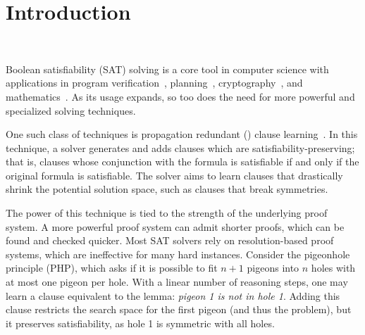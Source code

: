 \section{Introduction}~\label{sec:intro}


Boolean satisfiability (SAT) solving is a core tool in computer science with
applications in program
verification~\cite{BillionQueries,sat-hardwareverification,ic3,bmc},
planning~\cite{planning,planningassat}, cryptography~\cite{cryptominisat}, and
mathematics~\cite{chromaticnumber,pythagoreantriples,kellersconjecture,emptyhexagon}.
As its usage expands, so too does the need for more powerful and specialized
solving techniques.



One such class of techniques is propagation redundant (\pr) clause
learning~\cite{prclauses}. In this technique, a solver generates and adds
clauses which are satisfiability-preserving; that is, clauses whose conjunction
with the formula is satisfiable if and only if the original formula is
satisfiable. The solver aims to learn clauses that drastically shrink the
potential solution space, such as clauses that break symmetries.




The power of this technique is tied to the strength of the underlying proof
system. A more powerful proof system can admit shorter proofs, which can be
found and checked quicker. Most SAT solvers rely on resolution-based proof
systems, which are ineffective for many hard instances. Consider the pigeonhole
principle (PHP), which asks if it is possible to fit $n+1$ pigeons into $n$
holes with at most one pigeon per hole. With a linear number of \pr reasoning
steps, one may learn a \pr clause equivalent to the lemma: \emph{pigeon 1 is not
in hole 1}. Adding this clause restricts the search space for the first pigeon
(and thus the problem), but it preserves satisfiability, as hole 1 is symmetric
with all holes. 

